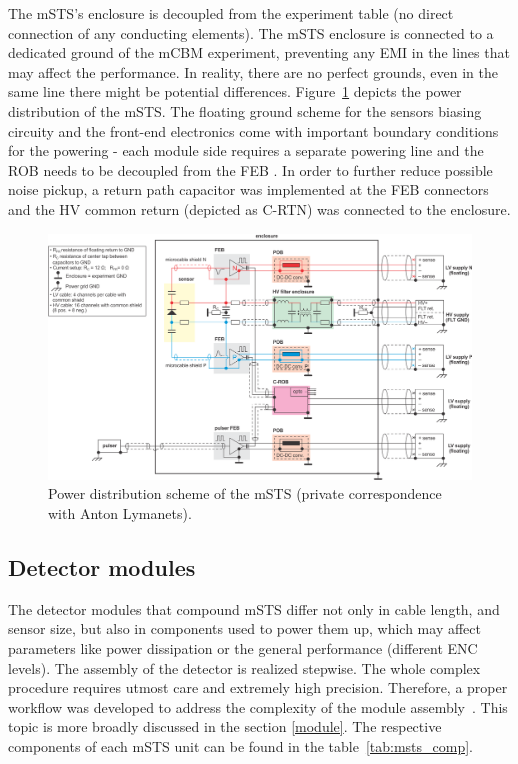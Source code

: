 The \gls{mSTS}'s enclosure is decoupled from the experiment table (no direct connection of any conducting elements). The \gls{mSTS} enclosure is connected to a dedicated ground of the \gls{mCBM} experiment, preventing any \gls{EMI} in the lines that may affect the performance. In reality, there are no perfect grounds, even in the same line there might be potential differences.  Figure~\ref{fig_msts_power} depicts the power distribution of the \gls{mSTS}. The floating ground scheme for the sensors biasing circuity and the front-end electronics come with important boundary conditions for the powering - each module side requires a separate powering line and the \gls{ROB} needs to be decoupled from the \gls{FEB} \cite{RodriguezRodriguez2020}. In order to further reduce possible noise pickup, a return path capacitor was implemented at the \gls{FEB} connectors and the \gls{HV} common return (depicted as C-RTN) was connected to the enclosure.
\begin{figure}[!h]
\centering
\includegraphics[width=1\columnwidth]{Chapter6/DCS/images/power_distribution.png}
\caption{Power distribution scheme of the \gls{mSTS} (private correspondence with Anton Lymanets).}
\label{fig_msts_power}
\end{figure}
\newpage

\subsection{Detector modules}
 The detector modules that compound \gls{mSTS} differ not only in cable length, and sensor size, but also in components used to power them up, which may affect parameters like power dissipation or the general performance (different ENC levels).  The assembly of the detector is realized stepwise. The whole complex procedure requires utmost care and extremely high precision. Therefore, a proper workflow was developed to address the complexity of the module assembly~\cite{carmen2}. This topic is more broadly discussed in the section \ref{module}. The respective components of each \gls{mSTS} unit can be found in the table~\ref{tab:msts_comp}. 

